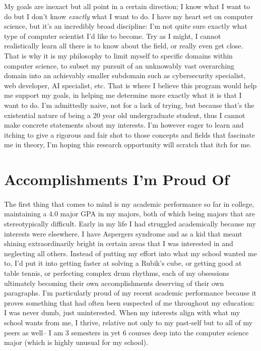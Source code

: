 \documentclass[12pt]{article}
\begin{document}
My goals are inexact but all point in a certain direction; I know what I want to do but I don’t know \textit{exactly} what I want to do. I have my heart set on computer science, but it’s an incredibly broad discipline: I’m not quite sure exactly what type of computer scientist I’d like to become. Try as I might, I cannot realistically learn all there is to know about the field, or really even get close. That is why it is my philosophy to limit myself to specific domains within computer science, to subset my pursuit of an unknowably vast overarching domain into an achievably smaller subdomain such as cybersecurity specialist, web developer, AI specialist, etc. That is where I believe this program would help me support my goals, in helping me determine more exactly what it is that I want to do. I’m admittedly naive, not for a lack of trying, but because that’s the existential nature of being a 20 year old undergraduate student, thus I cannot make concrete statements about my interests. I’m however eager to learn and itching to give a rigorous and fair shot to those concepts and fields that fascinate me in theory, I’m hoping this research opportunity will scratch that itch for me.

\section*{Accomplishments I'm Proud Of}

\paragraph{}

The first thing that comes to mind is my academic performance so far in college, maintaining a 4.0 major GPA in my majors, both of which being majors that are stereotypically difficult. Early in my life I had struggled academically because my interests were elsewhere. I have Aspergers syndrome and as a kid that meant shining extraordinarily bright in certain areas that I was interested in and neglecting all others. Instead of putting my effort into what my school wanted me to, I'd put it into getting faster at solving a Rubik's cube, or getting good at table tennis, or perfecting complex drum rhythms, each of my obsessions ultimately becoming their own accomplishments deserving of their own paragraphs. I'm particularly proud of my recent academic performance because it proves something that had often been suspected of me throughout my education: I was never dumb, just uninterested. When my interests align with what my school wants from me, I thrive, relative not only to my past-self but to all of my peers as well-- I am 3 semesters in yet 6 courses deep into the computer science major (which is highly unusual for my school).
\end{document}
